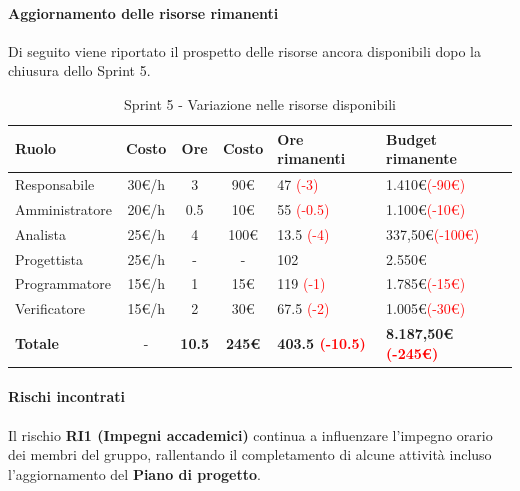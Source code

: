 \documentclass[a4paper,12pt]{article}
\begin{document}
\paragraph{Aggiornamento delle risorse rimanenti}
Di seguito viene riportato il prospetto delle risorse ancora disponibili dopo la chiusura dello Sprint 5.

\begin{table}[H]
    \centering
    \renewcommand{\arraystretch}{1.5}
    \begin{tabularx}{\textwidth}{|l|c|c|c|X|X|}
        \hline
        \rowcolor{tableHeader}
        \textbf{Ruolo} & \textbf{Costo} & \textbf{Ore} & \textbf{Costo} & \textbf{Ore rimanenti} & \textbf{Budget rimanente} \\
        \hline
        \rowcolor{tableLineOdd}
        Responsabile & 30\euro/h & 3 & 90\euro & 47 \textcolor{red}{(-3)} & 1.410\euro \textcolor{red}{(-90\euro)} \\
        \hline
        \rowcolor{tableLineEven}
        Amministratore & 20\euro/h & 0.5 & 10\euro & 55 \textcolor{red}{(-0.5)} & 1.100\euro \textcolor{red}{(-10\euro)} \\
        \hline
        \rowcolor{tableLineOdd}
        Analista & 25\euro/h & 4 & 100\euro & 13.5 \textcolor{red}{(-4)} & 337,50\euro \textcolor{red}{(-100\euro)} \\
        \hline
        \rowcolor{tableLineEven}
        Progettista & 25\euro/h & - & - & 102 & 2.550\euro \\
        \hline
        \rowcolor{tableLineOdd}
        Programmatore & 15\euro/h & 1 & 15\euro & 119 \textcolor{red}{(-1)} & 1.785\euro \textcolor{red}{(-15\euro)} \\
        \hline
        \rowcolor{tableLineEven}
        Verificatore & 15\euro/h & 2 & 30\euro & 67.5 \textcolor{red}{(-2)} & 1.005\euro \textcolor{red}{(-30\euro)} \\
        \hline
        \rowcolor{tableHeader}
        \textbf{Totale} & - & \textbf{10.5} & \textbf{245\euro} & \textbf{403.5 \textcolor{red}{(-10.5)}} & \textbf{8.187,50\euro \textcolor{red}{(-245\euro)}} \\
        \hline
    \end{tabularx}
    \caption{Sprint 5 - Variazione nelle risorse disponibili}
\end{table}

\paragraph{Rischi incontrati}
Il rischio \textbf{RI1 (Impegni accademici)} continua a influenzare l'impegno orario dei membri del gruppo, rallentando il completamento di alcune attività incluso l'aggiornamento del \textbf{Piano di progetto}.
\end{document}
